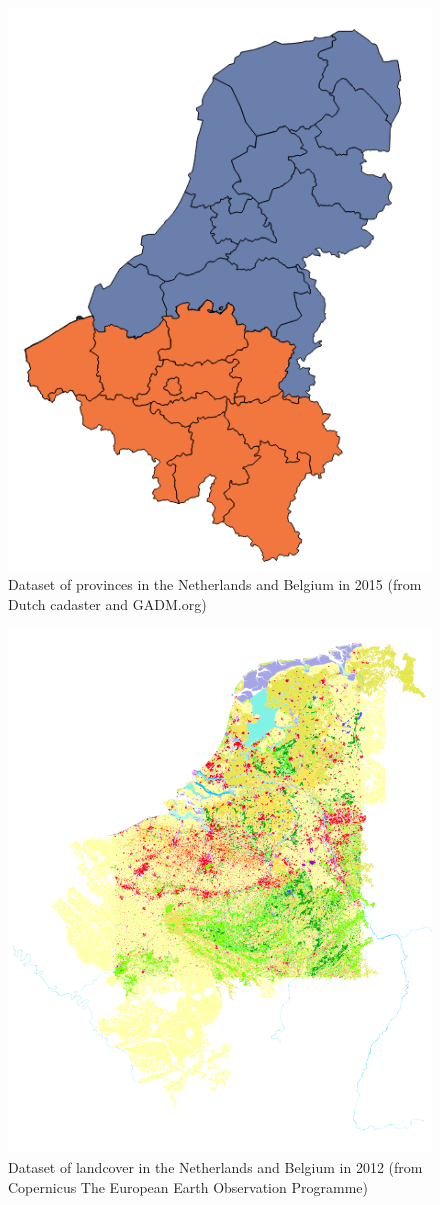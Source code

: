 \begin{figure}
	\centering
	\includegraphics[width=0.5\linewidth]{figs/Provinces.png}
	\caption{Dataset of provinces in the Netherlands and Belgium in 2015 (from Dutch cadaster and GADM.org)}
	\label{fig:provinces}
\end{figure}

\begin{figure}
	\centering
	\includegraphics[width=1\linewidth]{figs/CORINE_NL_BE_color.PNG}
	\caption{Dataset of landcover in the Netherlands and Belgium in 2012 (from Copernicus  The European Earth Observation Programme)}
	\label{fig:CORINE}
\end{figure}

